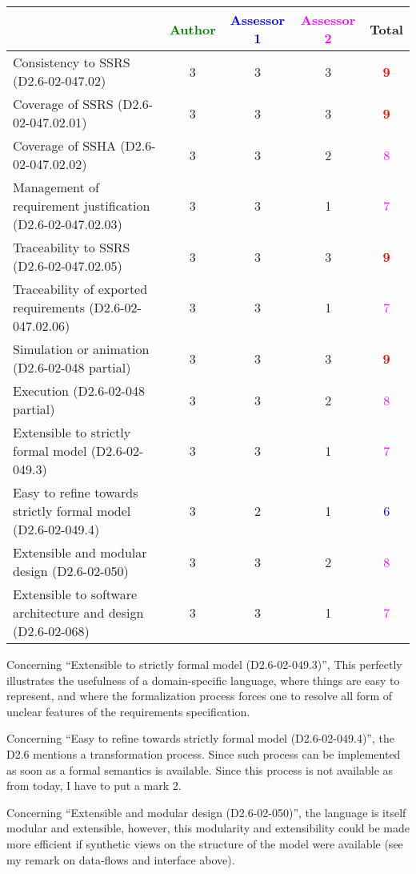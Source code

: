 \begin{tabular}{|l | c | c | c | c|}
\hline
& \textcolor{green}{Author} & \textcolor{blue}{Assessor 1} & \textcolor{magenta}{Assessor 2} & Total \\
\hline 
Consistency to SSRS (D2.6-02-047.02) & 3    & 3    & 3    & \textcolor{red}{\textbf{9}} \\
\hline
Coverage of SSRS (D2.6-02-047.02.01)  & 3    & 3    & 3    & \textcolor{red}{\textbf{9}} \\
\hline
Coverage of SSHA (D2.6-02-047.02.02)  & 3    & 3    & 2    & \textcolor{magenta}{8}  \\
\hline
Management of requirement justification (D2.6-02-047.02.03)  & 3    & 3    & 1    & \textcolor{magenta}{7}  \\
\hline
Traceability to  SSRS (D2.6-02-047.02.05)  & 3    & 3    & 3    & \textcolor{red}{\textbf{9}}  \\
\hline
Traceability of exported requirements (D2.6-02-047.02.06)  & 3    & 3    & 1    & \textcolor{magenta}{7}  \\
\hline
Simulation or animation (D2.6-02-048 partial)  & 3    & 3    & 3    & \textcolor{red}{\textbf{9}}  \\
\hline
Execution (D2.6-02-048 partial)  & 3    & 3    & 2    & \textcolor{magenta}{8}  \\
\hline
Extensible to strictly formal model (D2.6-02-049.3) & 3    & 3    & 1    & \textcolor{magenta}{7} \\
\hline
Easy to refine towards strictly formal model (D2.6-02-049.4) & 3    & 2    & 1    & \textcolor{blue}{6}  \\
\hline
Extensible and modular design (D2.6-02-050)  & 3    & 3    & 2    & \textcolor{magenta}{8}  \\
\hline
Extensible to software architecture and design (D2.6-02-068)   & 3    & 3    & 1    & \textcolor{magenta}{7}  \\
\hline
\end{tabular}


\begin{assessor1}
Concerning "`Extensible to strictly formal model (D2.6-02-049.3)"', This perfectly illustrates the usefulness of a domain-specific language, where things are easy to represent, and where the formalization process forces one to resolve all form of unclear features of the requirements specification. 

Concerning "`Easy to refine towards strictly formal model (D2.6-02-049.4)"', the D2.6 mentions a transformation process. Since such process can be implemented as soon as a formal semantics is available. Since this process is not available as from today, I have to put a mark 2. 

Concerning "`Extensible and modular design (D2.6-02-050)"', the language is itself modular and extensible, however, this modularity and extensibility could be made more efficient if synthetic views on the structure of the model were available (see my remark on data-flows and interface above). 
\end{assessor1}

